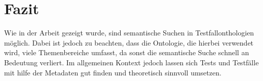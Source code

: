 \chapter{Fazit}
Wie in der Arbeit gezeigt wurde, sind semantische Suchen in Testfallonthologien möglich. Dabei ist jedoch zu beachten, dass die Ontologie, die hierbei verwendet wird, viele Themenbereiche umfasst, da sonst die semantische Suche schnell an Bedeutung verliert. Im allgemeinen Kontext jedoch lassen sich Tests und Testfälle mit hilfe der Metadaten gut finden und theoretisch sinnvoll umsetzen.